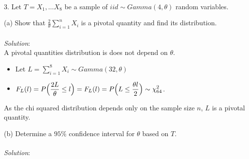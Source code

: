 \documentclass[12pt]{article}
\newcommand{\XB}{\color{black}}
\newcommand{\XBB}{\color{blue}}
\newcommand{\ds}{\displaystyle}
\begin{document}
\vspace{2.5mm}

\newpage
\XBB\hrulefill\XB \\

3. Let $ T = X_{1}, \dots X_{8} $ be a sample of $ iid \sim Gamma(4, \theta) $ random variables. \\

\XBB\hrulefill\XB
\vspace{5mm}

(a) Show that $ \ds \frac{2}{\theta} \sum_{i=1}^{n} X_{i} $ is a pivotal quantity and find its distribution. \\
\vspace{2.5mm} \\
\textit{Solution}:
\vspace{2.5mm} \\

\noindent
A pivotal quantities distribution is does not depend on $ \theta $. \\

\begin{itemize}
    \item Let $ \ds L = \sum_{i=1}^{8} X_{i} \sim Gamma(32, \theta) $
    \item $ \ds F_{L}(l) = P\Bigl( \frac{2L}{\theta} \le l \Bigr) = F_{L}(l) = P\Bigl( L \le \frac{\theta l}{2} \Bigr) \sim \chi_{64}^{2} $. \\
\end{itemize}

\noindent
As the chi squared distribution depends only on the sample size $ n $, $ L $ is a pivotal quantity. \\

\vspace{2.5mm}

(b) Determine a $ 95\% $ confidence interval for $ \theta $ based on $ T $. \\
\vspace{2.5mm} \\
\textit{Solution}:
\vspace{2.5mm} \\
\end{document}
